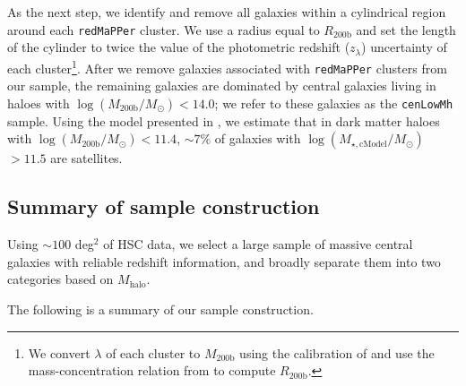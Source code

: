 \documentclass[fleqn,usenatbib]{mnras}
\def\redm{\texttt{redMaPPer}}
\def\nbcg{\texttt{cenLowMh}}
\def\logmh{{$\log (M_{\mathrm{200b}}/M_{\odot})$}}
\def\logmcmodel{{$\log (M_{\star,\mathrm{cModel}}/M_{\odot})$}}
\begin{document}
    As the next step, we identify and remove all galaxies within a cylindrical 
    region around each \redm{} cluster. 
    We use a radius equal to $R_{\mathrm{200b}}$ and set the length of the cylinder 
    to twice the value of the photometric redshift ($z_{\lambda}$) uncertainty 
    of each cluster\footnote{We convert $\lambda$ of each cluster to 
    $M_{\mathrm{200b}}$ using the calibration of \citet{Simet2016} and use the 
    mass-concentration relation from \citet{Diemer2015} to compute 
    $R_{\mathrm{200b}}$.}.
    After we remove galaxies associated with \redm{} clusters from our sample, 
    the remaining galaxies are dominated by central galaxies living in haloes with 
    \logmh{}$< 14.0$; we refer to these galaxies as the \nbcg{} sample.
    Using the model presented in \citet{Saito2016}, we estimate that in dark matter 
    haloes with \logmh$<11.4$, $\sim 7$\% of galaxies with \logmcmodel{}$>11.5$ are 
    satellites.
    

\subsection{Summary of sample construction}
    \label{ssec:sample}

    Using ${\sim} 100$ deg$^2$ of HSC data, we select a large sample of massive central 
    galaxies with reliable redshift information, and broadly separate them into two 
    categories based on $M_{\mathrm{halo}}$.
    
    The following is a summary of our sample construction. 
        
\end{document}
